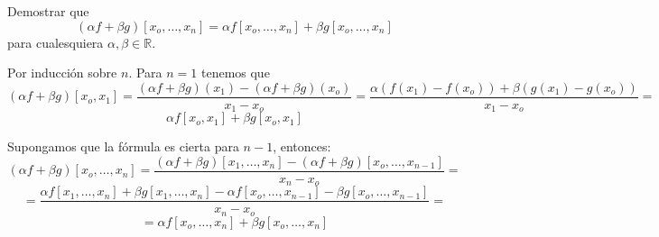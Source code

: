         \begin{ejer}
        Demostrar que
        $$(\alpha f+\beta g)[x_o,\ldots,x_n]=\alpha f[x_o,\ldots,x_n]+\beta g[x_o,\ldots,x_n]$$
        para cualesquiera $\alpha,\beta\in \mathbb{R}$.
        \end{ejer}
        \begin{sol}
        Por inducción sobre $n$. Para $n=1$ tenemos que
        $$(\alpha f+\beta g)[x_o,x_1]=\frac{(\alpha f+\beta g)(x_1)-(\alpha f+\beta g)(x_o)}{x_1-x_o}=\frac{\alpha (f(x_1)-f(x_o))+\beta (g(x_1)-g(x_o))}{x_1-x_o}=$$
        $$\alpha f[x_o,x_1]+\beta g[x_o,x_1]$$

        Supongamos que la fórmula es cierta para $n-1$, entonces:
        $$(\alpha f+\beta g)[x_o,\ldots,x_n]=\frac{(\alpha f+\beta g)[x_1,\ldots,x_n]-(\alpha f+\beta g)[x_o,\ldots,x_{n-1}]}{x_n-x_o}=$$
        $$=\frac{\alpha f[x_1,\ldots,x_n]+\beta g[x_1,\ldots,x_n]-\alpha f[x_o,\ldots,x_{n-1}]-\beta g[x_o,\ldots,x_{n-1}]}{x_n-x_o}=$$
        $$=\alpha f[x_o,\ldots,x_n]+\beta g[x_o,\ldots,x_n]$$       
        \end{sol}


        
        

          
       
        
       